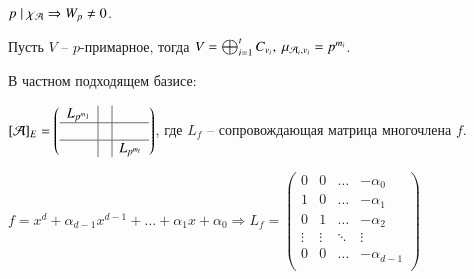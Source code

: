 \documentclass[main]{subfiles}
\begin{document}
\begin{remark}
    $p \mid \chi_{\mathcal{A}} \Rightarrow W_p \neq 0$.
\end{remark}

\begin{remark}
    Пусть $V$ -- $p$-примарное, тогда $V = \bigoplus_{i = 1}^{t} C_{v_i}, \ \mu_{\mca_i, v_i} = p^{m_i}$.
\end{remark}

В частном подходящем базисе:

$[\mathcal{A}]_E = \left(\begin{array}{c|c|c}
            L_{p^{m_1}} &  &             \\
            \hline
                        &  &             \\
            \hline
                        &  & L_{p^{m_t}} \\
        \end{array}\right)$, где $L_f$ -- сопровождающая матрица многочлена $f$.

$f = x^d + \alpha_{d - 1} x^{d - 1} + \ldots + \alpha_1x + \alpha_0 \Rightarrow L_f = \begin{pmatrix}
        0      & 0      & \ldots & -\alpha_0     \\
        1      & 0      & \ldots & -\alpha_1     \\
        0      & 1      & \ldots & -\alpha_2     \\
        \vdots & \vdots & \ddots & \vdots        \\
        0      & 0      & \ldots & -\alpha_{d-1} \\
    \end{pmatrix}$
\end{document}
